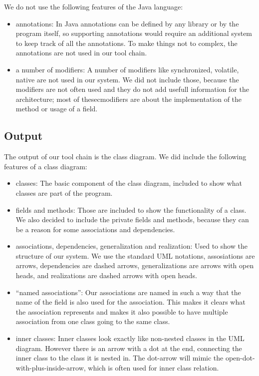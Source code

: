 \documentclass[a4paper,11pt]{article}
\begin{document}
			We do not use the following features of the Java language:
			\begin{itemize}
				\item annotations: In Java annotations can be defined by any library or by the program itself, so supporting annotations would require an additional system to keep track of all the annotations. To make things not to complex, the annotations are not used in our tool chain.
				\item a number of modifiers: A number of modifiers like synchronized, volatile, native are not used in our system. We did not include those, because the modifiers are not often used and they do not add usefull information for the architecture; most of thesecmodifiers are about the implementation of the method or usage of a field.
			\end{itemize}
		
		\subsection{Output}
			The output of our tool chain is the class diagram. We did include the following features of a class diagram:
			\begin{itemize}
				\item classes: The basic component of the class diagram, included to show what classes are part of the program.
				\item fields and methods: Those are included to show the functionality of a class. We also decided to include the private fields and methods, because they can be a reason for some associations and dependencies.
				\item associations, dependencies, generalization and realization: Used to show the structure of our system. We use the standard UML notations, assosiations are arrows, dependencies are dashed arrows, generalizations are arrows with open heads, and realizations are dashed arrows with open heads. 
				\item ``named associations'': Our associations are named in such a way that the name of the field is also used for the association. This makes it clears what the association represents and makes it also possible to have multiple association from one class going to the same class.
				\item inner classes: Inner classes look exactly like non-nested classes in the UML diagram. However there is an arrow with a dot at the end, connecting the inner class to the class it is nested in. The dot-arrow will mimic the open-dot-with-plus-inside-arrow, which is often used for inner class relation.
			\end{itemize}
		
\end{document}
